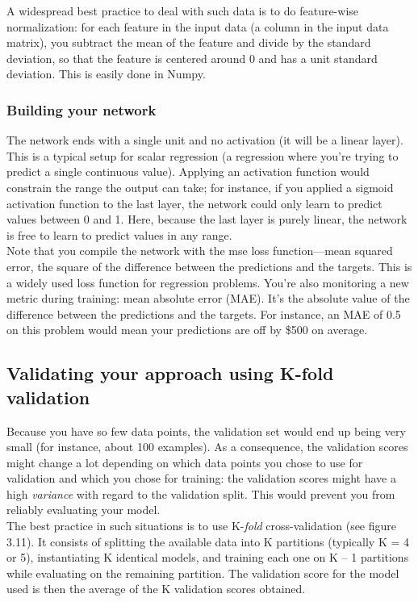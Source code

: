\documentclass{article}
\numberwithin{equation}{section} %
\begin{document}
A widespread best practice to deal with such data is to do feature-wise normalization: for each feature in the input data (a column in the input data matrix), you subtract the mean of the feature and divide by the standard deviation, so that the feature is centered around 0 and has a unit standard deviation. This is easily done in Numpy.

\subsubsection{Building your network}

The network ends with a single unit and no activation (it will be a linear layer). This is a typical setup for scalar regression (a regression where you’re trying to predict a single continuous value). Applying an activation function would constrain the range the output can take; for instance, if you applied a sigmoid activation function to the last layer, the network could only learn to predict values between 0 and 1. Here, because the last layer is purely linear, the network is free to learn to predict values in any range. \\

Note that you compile the network with the mse loss function—mean squared error, the square of the difference between the predictions and the targets. This is a widely used loss function for regression problems. You’re also monitoring a new metric during training: mean absolute error (MAE). It’s the absolute value of the difference between the predictions and the targets. For instance, an MAE of 0.5 on this problem would mean your predictions are off by \$500 on average. \\

\subsection{Validating your approach using K-fold validation}

Because you have so few data points, the validation set would end up being very small (for instance, about 100 examples). As a consequence, the validation scores might change a lot depending on which data points you chose to use for validation and which you chose for training: the validation scores might have a high \textit{variance} with regard to the validation split. This would prevent you from reliably evaluating your model. \\

The best practice in such situations is to use K-\textit{fold} cross-validation (see figure 3.11). It consists of splitting the available data into K partitions (typically K = 4 or 5), instantiating K identical models, and training each one on K – 1 partitions while evaluating on the remaining partition. The validation score for the model used is then the average of the K validation scores obtained. \\
\end{document}
